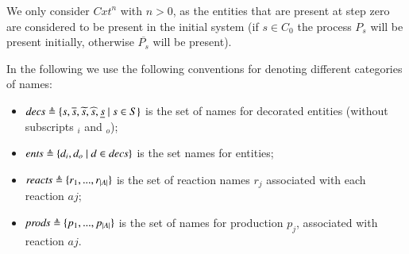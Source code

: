 



We only consider $\mathit{Cxt}^n$ with $n >0$, as the entities  that are present at step zero  are considered to be present in the initial system (if $s\in C_0$ the process $P_s$ will be present initially, otherwise $\overline{P_s}$ will be present).

In the following we use the following conventions for denoting different categories of names:
\begin{itemize}
\item
$\mathit{decs} \triangleq \{ s, \overline{s}, \widetilde{s},\widehat{s},\underline{s}~|~ s\in S\}$ is the set of names for decorated entities (without subscripts $_i$ and $_o$);
\item
$\mathit{ents} \triangleq \{ d_i, d_o~|~ d\in \mathit{decs}\}$ is the set names for entities;
\item
$\mathit{reacts}\triangleq \{r_1,...,r_{|A|}\}$ is the set of reaction names $r_j$ associated with each reaction $aj$;
\item 
$\mathit{prods}\triangleq \{p_1,...,p_{|A|}\}$ is the set of names for production $p_j$, associated with  reaction $aj$.
\end{itemize}





